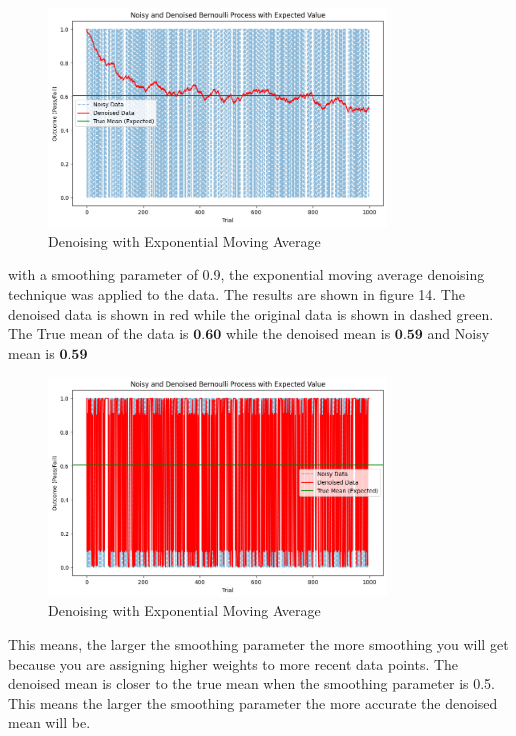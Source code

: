 \documentclass[a4paper,12pt]{article} %
\begin{document}
\begin{figure}[h]
\centering
\includegraphics[width=0.8\textwidth]{exp_0.01.png}
\caption{Denoising with Exponential Moving Average}
\end{figure}
\clearpage
with a smoothing parameter of 0.9, the exponential moving average denoising technique was applied to the data. The results are shown in figure 14. The denoised data is shown in red while the original data is shown in dashed green. The True mean of the data is \(\textbf{0.60}\) while the denoised mean is \(\textbf{0.59}\) and Noisy mean is \(\textbf{0.59}\)
\begin{figure}[h]
\centering
\includegraphics[width=0.8\textwidth]{exp_0.9.png}
\caption{Denoising with Exponential Moving Average}
\end{figure}
This means, the larger the smoothing parameter the more smoothing you will get because you are assigning higher weights to more recent data points. The denoised mean is closer to the true mean when the smoothing parameter is 0.5. This means the larger the smoothing parameter the more accurate the denoised mean will be.
\end{document}
